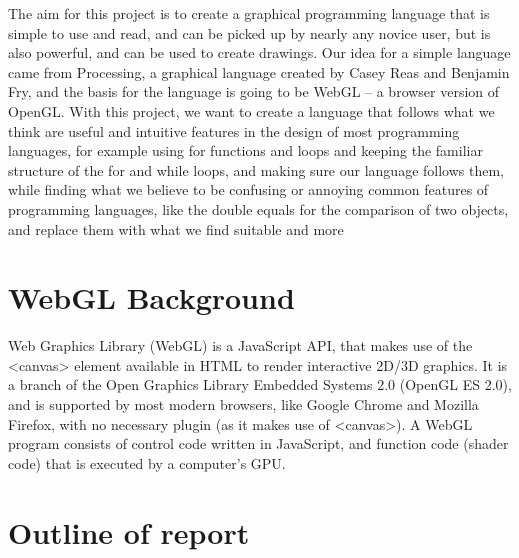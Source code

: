 \documentclass{l3proj}
\begin{document}
The aim for this project is to create a graphical programming language that is simple to use and read, and can be picked up by nearly any novice user, but is also powerful, and can be used to create drawings. Our idea for a simple language came from Processing, a graphical language created by Casey Reas and Benjamin Fry, and the basis for the language is going to be WebGL – a browser version of OpenGL. With this project, we want to create a language that follows what we think are useful and intuitive features in the design of most programming languages, for example using {} for functions and loops and keeping the familiar structure of the for and while loops, and making sure our language follows them, while finding what we believe to be confusing or annoying common features of programming languages, like the double equals for the comparison of two objects, and replace them with what we find suitable and more 

\section{WebGL Background}

Web Graphics Library (WebGL) is a JavaScript API, that makes use of the \textless{}canvas\textgreater{} element available in HTML to render interactive 2D/3D graphics. It is a branch of the Open Graphics Library Embedded Systems 2.0 (OpenGL ES 2.0), and is supported by most modern browsers, like Google Chrome and Mozilla Firefox, with no necessary plugin (as it makes use of \textless{}canvas\textgreater{}). A WebGL program consists of control code written in JavaScript, and function code (shader code) that is executed by a computer's GPU. 

\section{Outline of report}
\end{document}
